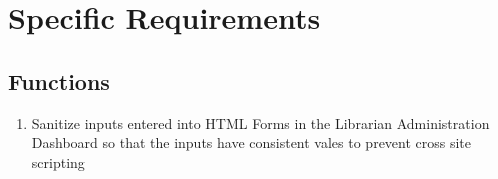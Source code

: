 \documentclass[letterpaper,10pt,titlepage, onecolumn, compsoc]{IEEEtran}
\begin{document}

\section{Specific Requirements}


\subsection{Functions}
\begin{enumerate}
	\item Sanitize inputs entered into HTML Forms in the Librarian Administration Dashboard so that the inputs have consistent vales to prevent cross site scripting
\end{enumerate}





\end{document}
